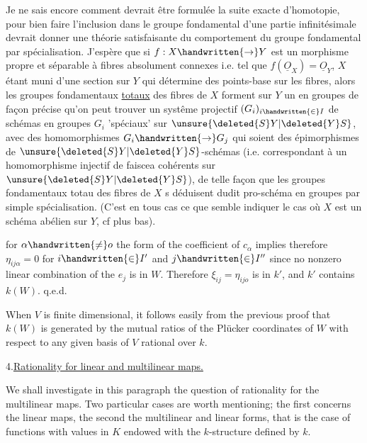 Je ne sais encore comment devrait être formulée la suite exacte d'homotopie, pour bien faire l'inclusion dans le groupe fondamental d'une partie infinitésimale devrait donner une théorie satisfaisante du comportement du groupe fondamental par spécialisation. J'espère que si $f:X\handwritten{\to}Y$ est un morphisme propre et séparable à fibres absolument connexes i.e. tel que $f(\underline{O}_X)=\underline{O}_Y$, $X$ étant muni   d'une section  sur $Y$ qui détermine des points-base sur les fibres, alors les groupes fondamentaux \uline{totaux} des fibres de $X$ forment sur $Y$ un  en groupes  de façon précise qu'on peut trouver un systême projectif  $(G_i)_{i\handwritten{\in}I}$ de schémas en groupes $G_i$ 'spéciaux' sur $\unsure{\deleted{S}Y|\deleted{Y}S}$, avec des homomorphismes $G_i\handwritten{\to}G_j$ qui soient des épimorphismes de $\unsure{\deleted{S}Y|\deleted{Y}S}$-schémas (i.e. correspondant à un homomorphisme injectif de faiscea cohérents sur $\unsure{\deleted{S}Y|\deleted{Y}S}$), de telle façon que les groupes fondamentaux totau des fibres de $X$ s déduisent dudit pro-schéma en groupes par simple spécialisation. (C'est en tous cas ce que semble indiquer le cas où $X$ est un schéma abélien sur $Y$, cf plus bas).


for $\alpha\handwritten{\ne}o$ the form of the coefficient of $c_\alpha$ implies therefore $\eta_{ij\alpha}=0$ for $i\handwritten{\in}I'$ and $j\handwritten{\in}I''$ since no nonzero linear combination of the $e_j$ is in $W$. Therefore $\xi_{ij}=\eta_{ijo}$ is in $k'$, and $k'$ contains $k(W)$. \hfill q.e.d.

When $V$ is finite dimensional, it follows easily from the previous proof that $k(W)$ is generated by the mutual ratios of the Plücker coordinates of $W$ with respect to any given basis of $V$ rational over $k$.

4.\quad \uline{Rationality for linear and multilinear maps.}

We shall investigate in this paragraph the question of rationality for the multilinear maps. Two particular cases are worth mentioning; the first concerns the linear maps, the second the multilinear and linear forms, that is the case of functions with values in $K$ endowed with the $k$-structure defined by $k$.

